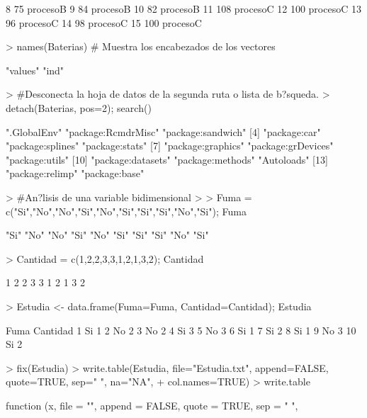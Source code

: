 \documentclass{article}
\begin{document}
\begin{Schunk}
\begin{Soutput}
8      75 procesoB
9      84 procesoB
10     82 procesoB
11    108 procesoC
12    100 procesoC
13     96 procesoC
14     98 procesoC
15    100 procesoC
\end{Soutput}
\begin{Sinput}
> names(Baterias) # Muestra los encabezados de los vectores
\end{Sinput}
\begin{Soutput}
[1] "values" "ind"   
\end{Soutput}
\begin{Sinput}
> #Desconecta la hoja de datos de la segunda ruta o lista de b?squeda.
> detach(Baterias, pos=2); search()
\end{Sinput}
\begin{Soutput}
 [1] ".GlobalEnv"        "package:RcmdrMisc" "package:sandwich" 
 [4] "package:car"       "package:splines"   "package:stats"    
 [7] "package:graphics"  "package:grDevices" "package:utils"    
[10] "package:datasets"  "package:methods"   "Autoloads"        
[13] "package:relimp"    "package:base"     
\end{Soutput}
\begin{Sinput}
> #An?lisis de una variable bidimensional
> 
> Fuma = c("Si","No","No","Si","No","Si","Si","Si","No","Si"); Fuma
\end{Sinput}
\begin{Soutput}
 [1] "Si" "No" "No" "Si" "No" "Si" "Si" "Si" "No" "Si"
\end{Soutput}
\begin{Sinput}
> Cantidad = c(1,2,2,3,3,1,2,1,3,2); Cantidad
\end{Sinput}
\begin{Soutput}
 [1] 1 2 2 3 3 1 2 1 3 2
\end{Soutput}
\begin{Sinput}
> Estudia <- data.frame(Fuma=Fuma, Cantidad=Cantidad); Estudia
\end{Sinput}
\begin{Soutput}
   Fuma Cantidad
1    Si        1
2    No        2
3    No        2
4    Si        3
5    No        3
6    Si        1
7    Si        2
8    Si        1
9    No        3
10   Si        2
\end{Soutput}
\begin{Sinput}
> fix(Estudia)
> write.table(Estudia, file="Estudia.txt", append=FALSE, quote=TRUE, sep=" ", na="NA",
+ col.names=TRUE)
> write.table
\end{Sinput}
\begin{Soutput}
function (x, file = "", append = FALSE, quote = TRUE, sep = " ", 

\end{Soutput}
\end{Schunk}
\end{document}
